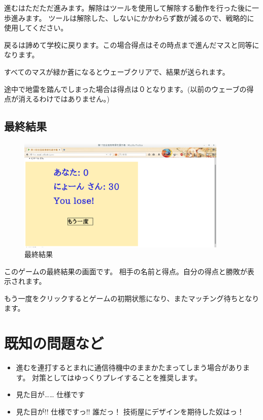 \documentclass{jsarticle}
\begin{document}
進むはただただ進みます。解除はツールを使用して解除する動作を行った後に一歩進みます。
ツールは解除した、しないにかかわらず数が減るので、戦略的に使用してください。

戻るは諦めて学校に戻ります。この場合得点はその時点まで進んだマスと同等になります。

すべてのマスが緑か蒼になるとウェーブクリアで、結果が送られます。

途中で地雷を踏んでしまった場合は得点は０となります。(以前のウェーブの得点が消えるわけではありません。)

\subsection{最終結果}\label{ux6700ux7d42ux7d50ux679c}

\begin{figure}[htbp]
\centering
\includegraphics[width=10cm]{./result.png}
\caption{最終結果}
\end{figure}

このゲームの最終結果の画面です。
相手の名前と得点。自分の得点と勝敗が表示されます。

もう一度をクリックするとゲームの初期状態になり、またマッチング待ちとなります。

\section{既知の問題など}\label{ux65e2ux77e5ux306eux554fux984cux306aux3069}

\begin{itemize}
\item  
  進むを連打するとまれに通信待機中のままかたまってしまう場合があります。 対策としてはゆっくりプレイすることを推奨します。
\item
  見た目が\ldots{}\ldots{} 仕様です
\item
  見た目が!! 仕様ですっ!! 誰だっ！ 技術屋にデザインを期待した奴はっ！
\end{itemize}
\end{document}
